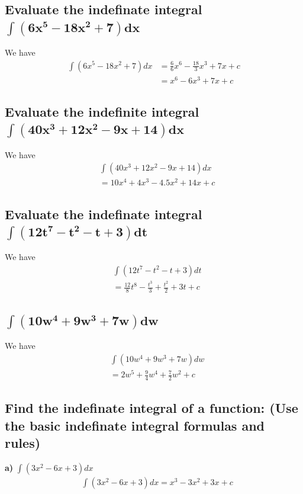 \documentclass{article}
\begin{document}
\begin{multicols}{2}

\subsection{Evaluate the indefinate integral $\mathbf{\int (6x^5 - 18x^2 + 7) dx}$}
We have
\begin{align*}
    \int (6x^5 - 18x^2 + 7) dx &= \frac{6}{6}x^6 - \frac{18}{3}x^3 + 7x + c \\
                                &= x^6 - 6x^3 + 7x + c
\end{align*}

\subsection{Evaluate the indefinite integral $\mathbf{\int (40x^3 + 12x^2 - 9x + 14)dx}$}
We have
\begin{align*}
    &\int (40x^3 + 12x^2 - 9x + 14)dx \\
    &= 10x^4 + 4x^3 - 4.5x^2 + 14x + c
\end{align*}


\subsection{Evaluate the indefinate integral $\mathbf{\int (12t^7 - t^2 - t + 3)dt}$}
We have
\begin{align*}
    &\int (12t^7 - t^2 - t + 3)dt \\
    &= \frac{12}{8}t^8 - \frac{t^3}{3} + \frac{t^2}{2} + 3t + c
\end{align*}


\subsection{$\mathbf{\int (10w^4 + 9w^3 + 7w)dw}$}
We have
\begin{align*}
    &\int (10w^4 + 9w^3 + 7w)dw \\
    &= 2w^5 + \frac{9}{4}w^4 + \frac{7}{2}w^2 + c
\end{align*}


\subsection{Find the indefinate integral of a function: (Use the basic indefinate integral formulas and rules)}

\textbf{a)} $\int (3x^2 - 6x + 3)dx$
\begin{align*}
    &\int (3x^2 - 6x + 3)dx = x^3 - 3x^2 + 3x + c
\end{align*}


\end{multicols}
\end{document}

